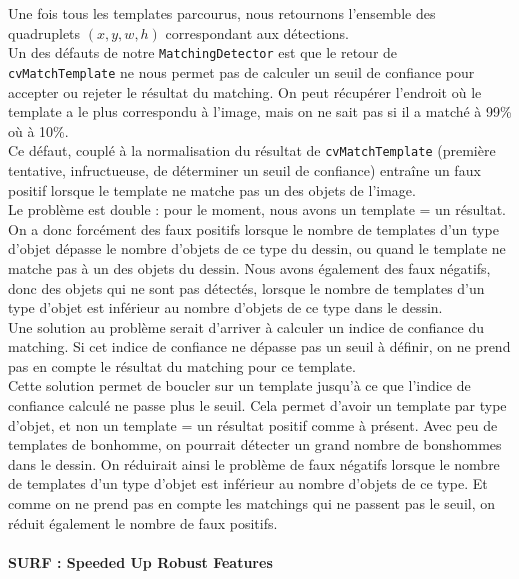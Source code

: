 Une fois tous les templates parcourus, nous retournons l'ensemble des quadruplets $(x,y,w,h)$ correspondant aux détections.\\

Un des défauts de notre \texttt{MatchingDetector} est que le retour de\\ \texttt{cvMatchTemplate} ne nous permet pas de calculer un seuil de confiance pour accepter ou rejeter le résultat du matching. On peut récupérer l'endroit où le template a le plus correspondu à l'image, mais on ne sait pas si il a matché à 99\% où à 10\%.\\

Ce défaut, couplé à la normalisation du résultat de \texttt{cvMatchTemplate} (première tentative, infructueuse, de déterminer un seuil de confiance) entraîne un faux positif lorsque le template ne matche pas un des objets de l'image.\\ Le problème est double : pour le moment, nous avons un template = un résultat. On a donc forcément des faux positifs lorsque le nombre de templates d'un type d'objet dépasse le nombre d'objets de ce type du dessin, ou quand le template ne matche pas à un des objets du dessin. Nous avons également des faux négatifs, donc des objets qui ne sont pas détectés, lorsque le nombre de templates d'un type d'objet est inférieur au nombre d'objets de ce type dans le dessin.\\

Une solution au problème serait d'arriver à calculer un indice de confiance du matching. Si cet indice de confiance ne dépasse pas un seuil à définir, on ne prend pas en compte le résultat du matching pour ce template.\\

Cette solution permet de boucler sur un template jusqu'à ce que l'indice de confiance calculé ne passe plus le seuil. Cela permet d'avoir un template par type d'objet, et non un template = un résultat positif comme à présent. Avec peu de templates de bonhomme, on pourrait détecter un grand nombre de bonshommes dans le dessin. On réduirait ainsi le problème de faux négatifs lorsque le nombre de templates d'un type d'objet est inférieur au nombre d'objets de ce type. Et comme on ne prend pas en compte les matchings qui ne passent pas le seuil, on réduit également le nombre de faux positifs.\\


\paragraph{SURF : Speeded Up Robust Features \cite{SURF}\vspace{0.5cm}\\}

